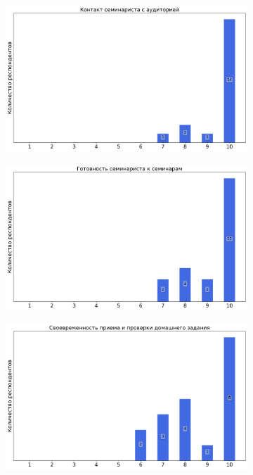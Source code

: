 		\begin{figure}[H]
			\centering
			\begin{subfigure}[b]{0.45\textwidth}
				\centering
				\includegraphics[width=\textwidth]{images/3 course/Вычислительная математика/seminarists-marks-Кожемяченко А.А.-0.png}
			\end{subfigure}
			\begin{subfigure}[b]{0.45\textwidth}
				\centering
				\includegraphics[width=\textwidth]{images/3 course/Вычислительная математика/seminarists-marks-Кожемяченко А.А.-1.png}
			\end{subfigure}
			\begin{subfigure}[b]{0.45\textwidth}
				\centering
				\includegraphics[width=\textwidth]{images/3 course/Вычислительная математика/seminarists-marks-Кожемяченко А.А.-2.png}

\end{subfigure}
\end{figure}
